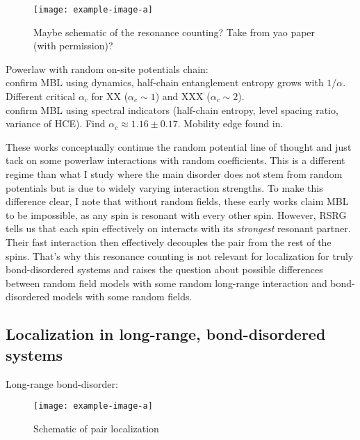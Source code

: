 \begin{figure}[htb]
	\centering
	\texttt{[image: example-image-a]}
	\caption{Maybe schematic of the resonance counting? Take from yao paper (with permission)?}
\end{figure}

Powerlaw with random on-site potentials chain:\\ \cite{safavi-nainiQuantumDynamicsDisordered2019} confirm MBL using dynamics, half-chain entanglement entropy grows with $1/\alpha$. Different critical $\alpha_c$ for XX ($\alpha_c\sim1$) and XXX ($\alpha_c\sim2$). \\
\cite{schifferManybodyLocalizationSpin2019} confirm MBL using spectral indicators (half-chain entropy, level spacing ratio, variance of HCE). Find $\alpha_c \approx 1.16\pm0.17$. Mobility edge found in\cite{yousefjaniMobilityEdgeLongrange2023}.

These works conceptually continue the random potential line of thought and just tack on some powerlaw interactions with random coefficients. This is a different regime than what I study where the main disorder does not stem from random potentials but is due to widely varying interaction strengths. To make this difference clear, I note that without random fields, these early works claim MBL to be impossible, as any spin is resonant with every other spin. However, RSRG tells us that each spin effectively on interacts with its \emph{strongest} resonant partner. Their fast interaction then effectively decouples the pair from the rest of the spins. That's why this resonance counting is not relevant for localization for truly bond-disordered systems and raises the question about possible differences between random field models with some random long-range interaction and bond-disordered models with some random fields.


\subsection{Localization in long-range, bond-disordered systems}

Long-range bond-disorder:
\cite{mohdebEntanglementPropertiesDisordered2020,mohdebExcitedEigenstateEntanglementProperties2022,mohdebGlobalQuenchDynamics2023}

\begin{figure}[htb]
	\centering
	\texttt{[image: example-image-a]}
	\caption{Schematic of pair localization}
\end{figure}

